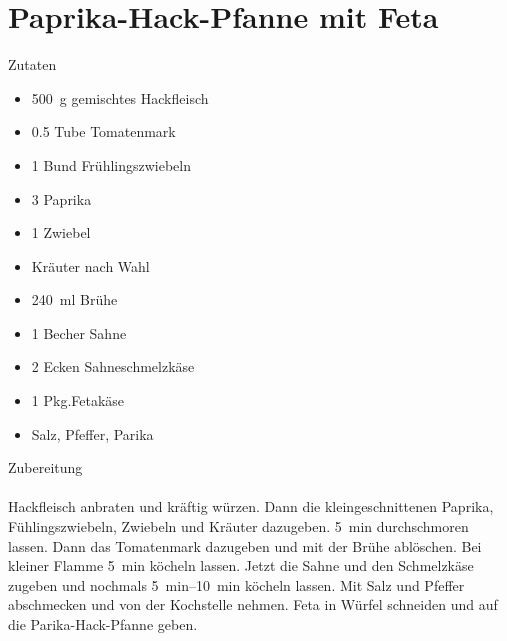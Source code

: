\section*{Paprika-Hack-Pfanne mit Feta}
\ihead{}\ohead{}
\cfoot{}
{\Large Zutaten}
\begin{multicols}{2}
\begin{itemize}
    \item \SI{500}{g} gemischtes Hackfleisch
    \item \num{0.5} Tube Tomatenmark
    \item \num{1} Bund Frühlingszwiebeln
    \item \num{3} Paprika
    \item \num{1} Zwiebel
    \item Kräuter nach Wahl
    \item \SI{240}{ml} Brühe
    \item \num{1} Becher Sahne
    \item \num{2} Ecken Sahneschmelzkäse
    \item \num{1} Pkg.Fetakäse
    \item Salz, Pfeffer, Parika
\end{itemize}
\end{multicols}
\noindent
{\Large Zubereitung}\\
\\
Hackfleisch anbraten und kräftig würzen.
Dann die kleingeschnittenen Paprika, Fühlingszwiebeln, Zwiebeln und Kräuter dazugeben. 
\SI{5}{min} durchschmoren lassen.
Dann das Tomatenmark dazugeben und mit der Brühe ablöschen.
Bei kleiner Flamme \SI{5}{min} köcheln lassen. 
Jetzt die Sahne und den Schmelzkäse zugeben und nochmals \SIrange{5}{10}{min} köcheln lassen. 
Mit Salz und Pfeffer abschmecken und von der Kochstelle nehmen.
Feta in Würfel schneiden und auf die Parika-Hack-Pfanne geben.
